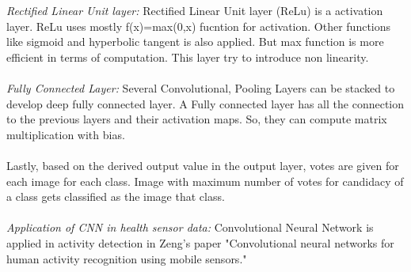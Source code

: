 \documentclass[conference]{IEEEtran}
\begin{document}
\emph{Rectified Linear Unit layer:} Rectified Linear Unit layer (ReLu) is a activation layer. ReLu uses mostly f(x)=max(0,x) fucntion for activation. Other functions like sigmoid and hyperbolic tangent is also applied. But max function is more efficient in terms of computation. This layer try to introduce non linearity.\\\\
\emph{Fully Connected Layer:} Several Convolutional, Pooling Layers can be stacked to develop deep fully connected layer. A Fully connected layer has all the connection to the previous layers and their activation maps. So, they can compute matrix multiplication with bias.\\\\
Lastly, based on the derived output value in the output layer, votes are given for each image for each class. Image with maximum number of votes for candidacy of a class gets classified as the image that class.\\\\
\emph{Application of CNN in health sensor data:}
Convolutional Neural Network is applied in activity detection in Zeng's paper "Convolutional neural networks for human activity recognition using mobile sensors."\cite{Zeng}\\
\end{document}
